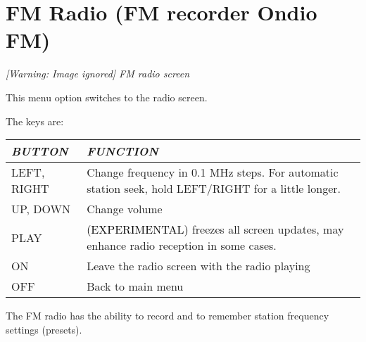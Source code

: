 \section{\label{ref:FMradio}FM Radio (FM recorder Ondio FM)}
{\centering\itshape
  [Warning: Image ignored] %
 \newline
FM radio screen
\par}

This menu option switches to the radio screen. 

The keys are:

\begin{tabular}[l]{|p{3.211cm}|p{13.424cm}|}
\hline
{\centering\bfseries\itshape
BUTTON
\par}
&
{\centering\bfseries\itshape
FUNCTION
\par}
\\\hline
{\centering
LEFT, RIGHT
\par}
&
Change frequency in 0.1 MHz steps.  For automatic station seek, hold
LEFT/RIGHT for a little longer.
\\\hline
{\centering
UP, DOWN
\par}
&
Change volume
\\\hline
{\centering
PLAY
\par}
&
\textcolor{black}{(EXPERIMENTAL) } freezes all
screen updates, may enhance radio reception in some cases.
\\\hline
{\centering
ON
\par}
&
Leave the radio screen with the radio playing 
\\\hline
{\centering
OFF
\par}
&
Back to main menu
\\\hline
\end{tabular}
The FM radio has the ability to record and to remember station frequency
settings (presets).

